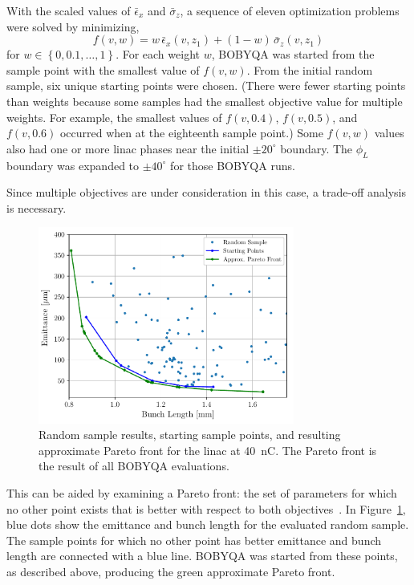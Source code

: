 With the scaled values of $\bar{\epsilon}_x$ and $\bar{\sigma}_z$, a sequence
of eleven optimization problems were solved by minimizing,
\begin{equation}
f(v,w) = w \,\bar{\epsilon}_x(v,z_1) + (1-w)\, \bar{\sigma}_z(v,z_1)
\label{eq:newobj}
\end{equation}
for $w \in \left\{ 0, 0.1, \ldots, 1 \right\}$. 
For each weight $w$, BOBYQA was started from the sample point with the 
smallest value of $f(v,w)$.  From the initial random sample, six unique starting points were chosen. 
(There were fewer starting points than weights because some samples had the smallest objective value for multiple weights. 
For example, the smallest values of $f(v,0.4)$, $f(v,0.5)$, and $f(v,0.6)$ occurred when at the eighteenth sample point.)
Some $f(v,w)$ values also had one or more linac phases near the initial $\pm20^{\circ}$ boundary. 
The $\phi_L$ boundary was expanded to $\pm40^{\circ}$ for those BOBYQA runs.

Since multiple objectives are under consideration in this case, a
trade-off analysis is necessary. 
\begin{figure}%
	\begin{center}
		\includegraphics[width=0.75\textwidth]{images/THPAB155f1}
		\caption{Random sample results, starting sample points, and resulting approximate Pareto front for the linac at \SI{40}{nC}. The Pareto front is the result of all BOBYQA evaluations.}
		\label{fig:pareto}
	\end{center}
\end{figure}
This can be aided by examining a Pareto front: the set of parameters 
for which no other point exists that is better with respect to both objectives~\cite{ehrgott2006multicriteria}.
In Figure~\ref{fig:pareto}, blue dots show the emittance and bunch length for the
evaluated random sample. The sample points for which no other point has better
emittance and bunch length are connected with a blue line. BOBYQA was started
from these points, as described above, producing the green approximate Pareto front. 

